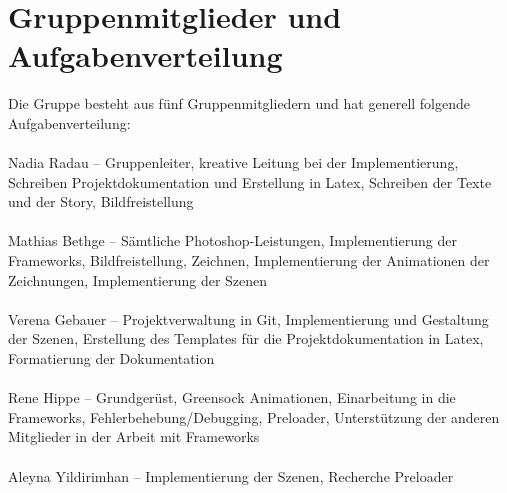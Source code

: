 \section{Gruppenmitglieder und Aufgabenverteilung}
Die Gruppe besteht aus fünf Gruppenmitgliedern und hat generell folgende Aufgabenverteilung:\\
\\ 
\textbullet Nadia Radau – Gruppenleiter, kreative Leitung bei der Implementierung, Schreiben Projektdokumentation und Erstellung in Latex, Schreiben der Texte und der Story, Bildfreistellung\\
\\
\textbullet Mathias Bethge – Sämtliche Photoshop-Leistungen, Implementierung der Frameworks, Bildfreistellung, Zeichnen, Implementierung der Animationen der Zeichnungen, Implementierung der Szenen\\
\\
\textbullet Verena Gebauer – Projektverwaltung in Git, Implementierung und Gestaltung der Szenen, Erstellung des Templates für die Projektdokumentation in Latex, Formatierung der Dokumentation\\
\\
\textbullet Rene Hippe – Grundgerüst, Greensock Animationen, Einarbeitung in die Frameworks, Fehlerbehebung/Debugging, Preloader, Unterstützung der anderen Mitglieder in der Arbeit mit Frameworks\\
\\
\textbullet Aleyna Yildirimhan – Implementierung der Szenen, Recherche Preloader